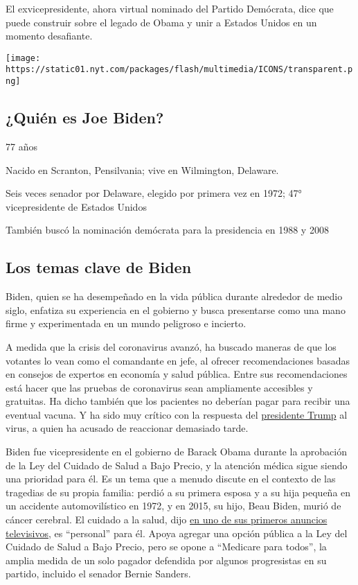 El exvicepresidente, ahora virtual nominado del Partido Demócrata, dice
que puede construir sobre el legado de Obama y unir a Estados Unidos en
un momento desafiante.

\texttt{[image: https://static01.nyt.com/packages/flash/multimedia/ICONS/transparent.png]}

\hypertarget{quiuxe9n-es-joe-biden}{%
\subsection{¿Quién es Joe Biden?}\label{quiuxe9n-es-joe-biden}}

77 años

Nacido en Scranton, Pensilvania; vive en Wilmington, Delaware.

Seis veces senador por Delaware, elegido por primera vez en 1972; 47°
vicepresidente de Estados Unidos

También buscó la nominación demócrata para la presidencia en 1988 y 2008

\hypertarget{los-temas-clave-de-biden}{%
\subsection{Los temas clave de Biden}\label{los-temas-clave-de-biden}}

Biden, quien se ha desempeñado en la vida pública durante alrededor de
medio siglo, enfatiza su experiencia en el gobierno y busca presentarse
como una mano firme y experimentada en un mundo peligroso e incierto.

A medida que la crisis del coronavirus avanzó, ha buscado maneras de que
los votantes lo vean como el comandante en jefe, al ofrecer
recomendaciones basadas en consejos de expertos en economía y salud
pública. Entre sus recomendaciones está hacer que las pruebas de
coronavirus sean ampliamente accesibles y gratuitas. Ha dicho también
que los pacientes no deberían pagar para recibir una eventual vacuna. Y
ha sido muy crítico con la respuesta del
\href{https://www.nytimes.com/interactive/2020/07/13/espanol/mundo/donald-trump-elecciones.html}{presidente
Trump} al virus, a quien ha acusado de reaccionar demasiado tarde.

Biden fue vicepresidente en el gobierno de Barack Obama durante la
aprobación de la Ley del Cuidado de Salud a Bajo Precio, y la atención
médica sigue siendo una prioridad para él. Es un tema que a menudo
discute en el contexto de las tragedias de su propia familia: perdió a
su primera esposa y a su hija pequeña en un accidente automovilístico en
1972, y en 2015, su hijo, Beau Biden, murió de cáncer cerebral. El
cuidado a la salud, dijo
\href{https://www.nytimes.com/2019/08/27/us/politics/joe-biden-ad-personal.html}{en
uno de sus primeros anuncios televisivos}, es ``personal'' para él.
Apoya agregar una opción pública a la Ley del Cuidado de Salud a Bajo
Precio, pero se opone a ``Medicare para todos'', la amplia medida de un
solo pagador defendida por algunos progresistas en su partido, incluido
el senador Bernie Sanders.

